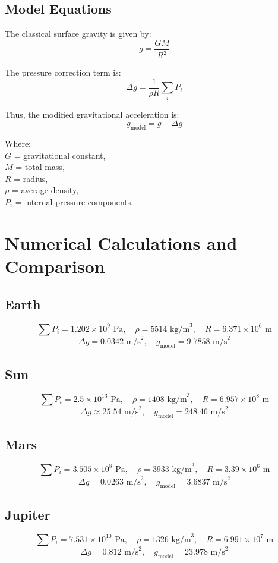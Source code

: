\documentclass[12pt,a4paper]{article}
\begin{document}
\subsection{Model Equations}
The classical surface gravity is given by:
\[
g = \frac{GM}{R^{2}}
\]

The pressure correction term is:
\[
\Delta g = \frac{1}{\rho R} \sum_i P_i
\]

Thus, the modified gravitational acceleration is:
\[
g_{\text{model}} = g - \Delta g
\]

Where: \\
$G$ = gravitational constant, \\
$M$ = total mass, \\
$R$ = radius, \\
$\rho$ = average density, \\
$P_i$ = internal pressure components.

\section{Numerical Calculations and Comparison}
\subsection{Earth}
\[
\sum P_i = 1.202 \times 10^{9} \text{ Pa}, \quad \rho = 5514 \text{ kg/m}^3, \quad R = 6.371 \times 10^{6} \text{ m}
\]
\[
\Delta g = 0.0342 \text{ m/s}^2, \quad g_{\text{model}} = 9.7858 \text{ m/s}^2
\]

\subsection{Sun}
\[
\sum P_i = 2.5 \times 10^{13} \text{ Pa}, \quad \rho = 1408 \text{ kg/m}^3, \quad R = 6.957 \times 10^{8} \text{ m}
\]
\[
\Delta g \approx 25.54 \text{ m/s}^2, \quad g_{\text{model}} = 248.46 \text{ m/s}^2
\]

\subsection{Mars}
\[
\sum P_i = 3.505 \times 10^{8} \text{ Pa}, \quad \rho = 3933 \text{ kg/m}^3, \quad R = 3.39 \times 10^{6} \text{ m}
\]
\[
\Delta g = 0.0263 \text{ m/s}^2, \quad g_{\text{model}} = 3.6837 \text{ m/s}^2
\]

\subsection{Jupiter}
\[
\sum P_i = 7.531 \times 10^{10} \text{ Pa}, \quad \rho = 1326 \text{ kg/m}^3, \quad R = 6.991 \times 10^{7} \text{ m}
\]
\[
\Delta g = 0.812 \text{ m/s}^2, \quad g_{\text{model}} = 23.978 \text{ m/s}^2
\]
\end{document}

